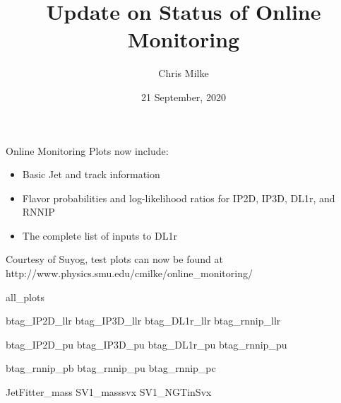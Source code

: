 \documentclass{beamer}
\begin{document}
    \title{Update on Status of Online Monitoring}
    \author{Chris Milke}
    \date{21 September, 2020}

    \frame{\titlepage}

    {
        Online Monitoring Plots now include:
        \begin{itemize}
            \item Basic Jet and track information
            \item Flavor probabilities and log-likelihood ratios for IP2D, IP3D, DL1r, and RNNIP
            \item The complete list of inputs to DL1r
        \end{itemize}

        \vspace{10mm}
        {\tiny Courtesy of Suyog, test plots can now be found at \\ http://www.physics.smu.edu/cmilke/online\_monitoring/}
    }{all_plots}

        {btag_IP2D_llr}
        {btag_IP3D_llr}
        {btag_DL1r_llr}
        {btag_rnnip_llr}

        {btag_IP2D_pu}
        {btag_IP3D_pu}
        {btag_DL1r_pu}
        {btag_rnnip_pu}

        {}
        {btag_rnnip_pb}
        {btag_rnnip_pu}
        {btag_rnnip_pc}

        {}
        {JetFitter_mass}
        {SV1_masssvx}
        {SV1_NGTinSvx}
   
\end{document}
